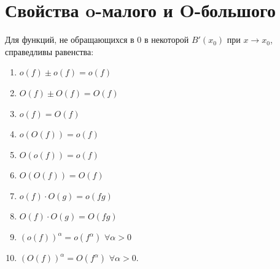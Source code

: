 	\section{Свойства o-малого и O-большого}
	
	\begin{theorem}
		Для функций, не обращающихся в $0$ в некоторой $B'(x_0)$ при $x \to x_0$, справедливы равенства:
		\begin{enumerate}
			\item $o(f) \pm o(f) = o(f)$
			\item $O(f) \pm O(f) = O(f)$
			\item $o(f) = O(f)$
			\item $o(O(f)) = o(f)$
			\item $O(o(f)) = o(f)$
			\item $O(O(f)) = O(f)$
			\item $o(f) \cdot O(g) = o(fg)$
			\item $O(f) \cdot O(g) = O(fg)$
			\item $(o(f))^{\alpha} = o(f^{\alpha})$ $\forall \alpha > 0$
			\item $(O(f))^{\alpha} = O(f^{\alpha})$ $\forall \alpha > 0$.
		\end{enumerate}
	\end{theorem}
	
